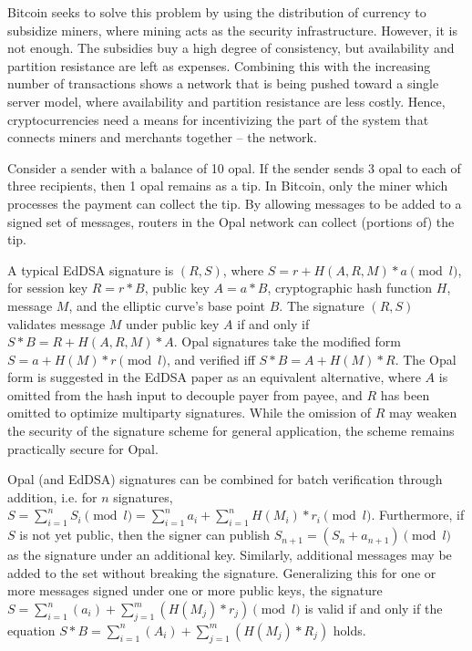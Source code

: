 \documentclass[10pt,twocolumn]{article}
\begin{document}
Bitcoin seeks to solve this problem by using the distribution of currency to subsidize miners, where mining acts as the security infrastructure.  However, it is not enough.  The subsidies buy a high degree of consistency, but availability and partition resistance are left as expenses.  Combining this with the increasing number of transactions shows a network that is being pushed toward a single server model, where availability and partition resistance are less costly.  Hence, cryptocurrencies need a means for incentivizing the part of the system that connects miners and merchants together -- the network.  

Consider a sender with a balance of 10 opal.  If the sender sends 3 opal to each of three recipients, then 1 opal remains as a tip.  In Bitcoin, only the miner which processes the payment can collect the tip.  By allowing messages to be added to a signed set of messages, routers in the Opal network can collect (portions of) the tip.

A typical EdDSA signature \cite{bern12} is $(R,S)$, where $S = r + H(A,R,M)*a\pmod{l}$, for session key $R = r*B$, public key $A = a*B$, cryptographic hash function $H$, message $M$, and the elliptic curve's base point $B$.  The signature $(R,S)$ validates message $M$ under public key $A$ if and only if $S*B = R + H(A,R,M)*A$.  Opal signatures take the modified form $S = a + H(M)*r\pmod{l}$, and verified iff $S*B = A + H(M)*R$.  The Opal form is suggested in the EdDSA paper as an equivalent alternative, where $A$ is omitted from the hash input to decouple payer from payee, and $R$ has been omitted to optimize multiparty signatures.  While the omission of $R$ may weaken the security of the signature scheme for general application, the scheme remains practically secure for Opal.

Opal (and EdDSA) signatures can be combined for batch verification through addition, i.e. for $n$ signatures, $S = \sum_{i=1}^{n}S_i\pmod{l} = \sum_{i=1}^{n}a_i + \sum_{i=1}^{n}H(M_i)*r_i\pmod{l}$.  Furthermore, if $S$ is not yet public, then the signer can publish $S_{n+1} = (S_n + a_{n+1})\pmod{l}$ as the signature under an additional key.  Similarly, additional messages may be added to the set without breaking the signature.  Generalizing this for one or more messages signed under one or more public keys, the signature $S = \sum_{i=1}^{n}(a_i) + \sum_{j=1}^{m}(H(M_j)*r_j)\pmod{l}$ is valid if and only if the equation $S*B = \sum_{i=1}^{n}(A_i) + \sum_{j=1}^{m}(H(M_j) * R_j)$ holds.
\end{document}
